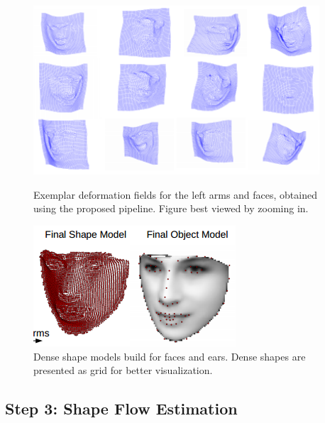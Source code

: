 \begin{figure}
    \\
    \includegraphics[width=0.95\textwidth]{resources/Annotation_Correction/df}
    \caption{Exemplar deformation fields for the left arms and faces, obtained using the proposed pipeline. Figure best viewed by zooming in.}
    \label{fig:deformationfield}
\end{figure}

\begin{figure}
    \centering
    \includegraphics[width=\textwidth]{resources/Annotation_Correction/models}
    \caption{Dense shape models build for faces and ears. Dense shapes are presented as grid for better visualization.}
    \label{fig:models}
    \label{fig:dense_models}
\end{figure}

\subsection*{Step 3: Shape Flow Estimation}
\label{sec:step3}

